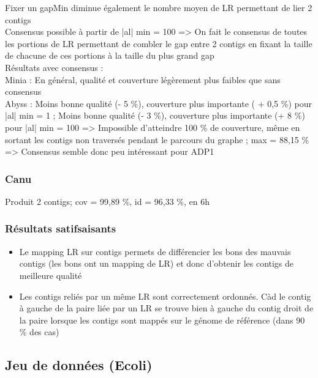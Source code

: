 \documentclass[12pt]{article}
\begin{document}
Fixer un gapMin diminue également le nombre moyen de LR permettant de lier 2 contigs \\

Consensus possible à partir de |al| min = 100 => On fait le consensus de toutes les portions de LR permettant de combler le gap entre 2 contigs en fixant la taille de chacune de ces portions à la taille du plus grand gap \\

Résultats avec consensus : \\

Minia : En général, qualité et couverture légèrement plus faibles que sans consensus \\

Abyss : Moins bonne qualité (- 5 \%), couverture plus importante ( + 0,5 \%) pour |al| min = 1 ; Moins bonne qualité (- 3 \%), couverture plus importante (+ 8 \%) pour |al| min = 100 => Impossible d'atteindre 100 \% de couverture, même en sortant les contigs non traversés pendant le parcours du graphe ; max = 88,15 \% \\

=> Consensus semble donc peu intéressant pour ADP1

\subsubsection{Canu}

Produit 2 contigs; cov = 99,89 \%, id = 96,33 \%, en 6h

\subsubsection{Résultats satifsaisants}

\begin{itemize}
	\item Le mapping LR sur contigs permets de différencier les bons des mauvais contigs (les bons ont un mapping de LR) et donc d'obtenir les contigs
	de meilleure qualité
	
	\item Les contigs reliés par un même LR sont correctement ordonnés. Càd le contig à gauche de la paire liée par un LR se trouve bien à gauche
	du contig droit de la paire lorsque les contigs sont mappés sur le génome de référence (dans 90 \% des cas)
\end{itemize}

\subsection{Jeu de données (Ecoli)}
\end{document}
